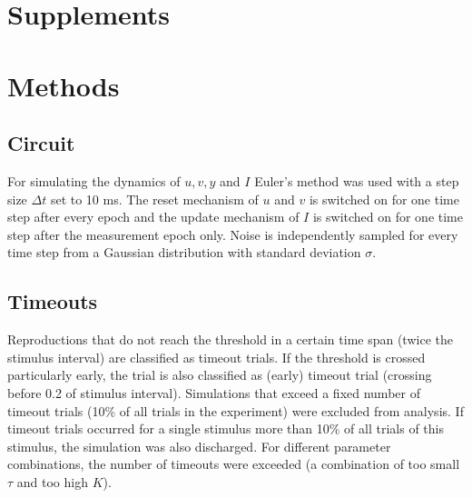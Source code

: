 \documentclass[10pt]{article}
\begin{document}
\pagebreak

\setcounter{section}{0}
\section*{Supplements}
\setcounter{figure}{0}
\setcounter{table}{0}
\setcounter{equation}{0} 
\renewcommand{\figurename}{Supplementary Figure}
\renewcommand{\tablename}{Supplementary Table}

\section*{Methods}
\subsection*{Circuit}
For simulating the dynamics of $u, v, y$ and $I$ Euler's method was used with a step size $\Delta t$ set to 10 ms.
The reset mechanism of $u$ and $v$ is switched on for one time step after every epoch and the update mechanism of $I$ is switched on for one time step after the measurement epoch only.
Noise is independently sampled for every time step from a Gaussian distribution with standard deviation $\sigma$.

\subsection*{Timeouts}
Reproductions that do not reach the threshold in a certain time span (twice the stimulus interval) are classified as timeout trials. 
If the threshold is crossed particularly early, the trial is also classified as (early) timeout trial (crossing before 0.2 of stimulus interval).
Simulations that exceed a fixed number of timeout trials (10\% of all trials in the experiment) were excluded from analysis.
If timeout trials occurred for a single stimulus more than 10\% of all trials of this stimulus, the simulation was also discharged.
For different parameter combinations, the number of timeouts were exceeded (a combination of too small $\tau$ and too high $K$).
\end{document}
